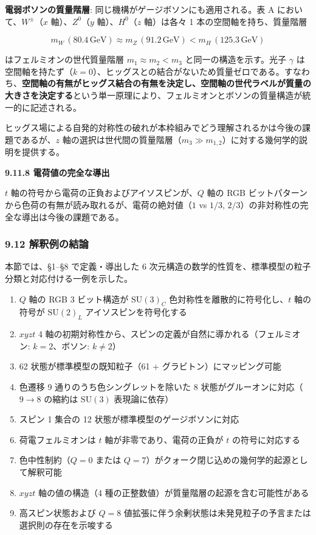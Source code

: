 \documentclass[
  a4paper,11pt]{ltjsarticle}
\providecommand{\tightlist}{%
  \setlength{\itemsep}{0pt}\setlength{\parskip}{0pt}}
\theoremstyle{definition}
\theoremstyle{remark}
\begin{document}
\textbf{電弱ボソンの質量階層}: 同じ機構がゲージボソンにも適用される。表
A において、\(W^\pm\)（\(x\) 軸）、\(Z^0\)（\(y\) 軸）、\(H^0\)（\(z\)
軸）は各々 1 本の空間軸を持ち、質量階層

\[m_W \,(80.4\,\text{GeV}) \approx m_Z \,(91.2\,\text{GeV}) < m_H \,(125.3\,\text{GeV})\]

はフェルミオンの世代質量階層 \(m_1 \approx m_2 < m_3\)
と同一の構造を示す。光子 \(\gamma\)
は空間軸を持たず（\(k = 0\)）、ヒッグスとの結合がないため質量ゼロである。すなわち、\textbf{空間軸の有無がヒッグス結合の有無を決定し、空間軸の世代ラベルが質量の大きさを決定する}という単一原理により、フェルミオンとボソンの質量構造が統一的に記述される。

ヒッグス場による自発的対称性の破れが本枠組みでどう理解されるかは今後の課題であるが、\(z\)
軸の選択は世代間の質量階層（\(m_3 \gg m_{1,2}\)）に対する幾何学的説明を提供する。

\textbf{9.11.8 電荷値の完全な導出}

\(t\) 軸の符号から電荷の正負およびアイソスピンが、\(Q\) 軸の RGB
ビットパターンから色荷の有無が読み取れるが、電荷の絶対値（\(1\) vs
\(1/3\), \(2/3\)）の非対称性の完全な導出は今後の課題である。

\subsubsection{9.12
解釈例の結論}\label{ux89e3ux91c8ux4f8bux306eux7d50ux8ad6}

本節では、§1--§8 で定義・導出した 6
次元構造の数学的性質を、標準模型の粒子分類と対応付ける一例を示した。

\begin{enumerate}
\def\labelenumi{\arabic{enumi}.}
\tightlist
\item
  \(Q\) 軸の RGB 3 ビット構造が \(\mathrm{SU}(3)_C\)
  色対称性を離散的に符号化し、\(t\) 軸の符号が \(\mathrm{SU}(2)_L\)
  アイソスピンを符号化する
\item
  \(xyzt\) 4
  軸の初期対称性から、スピンの定義が自然に導かれる（フェルミオン:
  \(k = 2\)、ボソン: \(k \neq 2\)）
\item
  62 状態が標準模型の既知粒子（61 + グラビトン）にマッピング可能
\item
  色遷移 9 通りのうち色シングレットを除いた 8
  状態がグルーオンに対応（\(9 \to 8\) の縮約は \(\mathrm{SU}(3)\)
  表現論に依存）
\item
  スピン 1 集合の 12 状態が標準模型のゲージボソンに対応
\item
  荷電フェルミオンは \(t\) 軸が非零であり、電荷の正負が \(t\)
  の符号に対応する
\item
  色中性制約（\(Q = 0\) または
  \(Q = 7\)）がクォーク閉じ込めの幾何学的起源として解釈可能
\item
  \(xyzt\) 軸の値の構造（4
  種の正整数値）が質量階層の起源を含む可能性がある
\item
  高スピン状態および \(Q = 8\)
  値拡張に伴う余剰状態は未発見粒子の予言または選択則の存在を示唆する
\end{enumerate}
\end{document}
